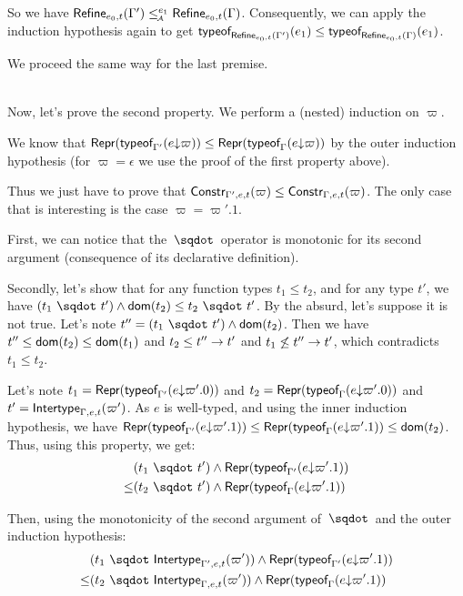 \documentclass[a4paper]{article}
\theoremstyle{definition}
\begin{document}
\begin{description}
    So we have $\Refine {e_0,t} {\Gamma'} \leqA^{e_1} \Refine {e_0,t} \Gamma$.
    Consequently, we can apply the induction hypothesis again to get
    $\tyof {e_1} {\Refine {e_0,t} {\Gamma'}} \leq \tyof {e_1} {\Refine {e_0,t} {\Gamma}}$.

    We proceed the same way for the last premise.
  \end{description}\ \\

  Now, let's prove the second property.
  We perform a (nested) induction on $\varpi$.

  We know that $\tsrep{\tyof {\occ e \varpi} {\Gamma'}} \leq \tsrep{\tyof {\occ e \varpi} {\Gamma}}$
  by the outer induction hypothesis (for $\varpi=\epsilon$ we use the proof of the first property above).

  Thus we just have to prove that $\constr {\varpi} {\Gamma',e,t} \leq \constr {\varpi} {\Gamma,e,t}$.
  The only case that is interesting is the case $\varpi=\varpi'.1$.

  First, we can notice that the $\worra {} {}$ operator is monotonic for its second argument
  (consequence of its declarative definition).

  Secondly, let's show that for any function types $t_1 \leq t_2$, and for any type $t'$,
  we have $(\worra {t_1} {t'}) \land \dom {t_2} \leq \worra {t_2} {t'}$. By the absurd, let's suppose it is not true.
  Let's note $t'' = (\worra {t_1} {t'}) \land \dom {t_2}$.
  Then we have $t'' \leq \dom {t_2} \leq \dom {t_1}$ and $t_2 \leq \arrow {t''} {t'}$ and
  $t_1 \not\leq \arrow {t''} {t'}$, which contradicts $t_1 \leq t_2$.

  Let's note $t_1 = \tsrep {\tyof{\occ e{\varpi'.0}}{\Gamma'}}$ and $t_2 = \tsrep {\tyof{\occ e{\varpi'.0}}\Gamma}$
  and $t'=\env {\Gamma,e,t} (\varpi')$.
  As $e$ is well-typed, and using the inner induction hypothesis, we have $\tsrep {\tyof {\occ e {\varpi'.1}} {\Gamma'}} \leq \tsrep {\tyof {\occ e {\varpi'.1}} {\Gamma}} \leq \dom {t_2}$.\\
  Thus, using this property, we get:\\
  \begin{align*}
  &(\worra {t_1} {t'}) \land \tsrep {\tyof {\occ e {\varpi'.1}} {\Gamma'}}\\
  \leq &(\worra {t_2} {t'}) \land \tsrep {\tyof {\occ e {\varpi'.1}} {\Gamma}}
  \end{align*}

  Then, using the monotonicity of the second argument of $\worra {}{}$ and the outer induction hypothesis:
  \begin{align*}
    &(\worra {t_1} {\env {\Gamma',e,t} (\varpi')}) \land \tsrep {\tyof {\occ e {\varpi'.1}} {\Gamma'}}\\
    \leq &(\worra {t_2} {\env {\Gamma,e,t} (\varpi')}) \land \tsrep {\tyof {\occ e {\varpi'.1}} {\Gamma}}
  \end{align*}
  \\
\end{document}
